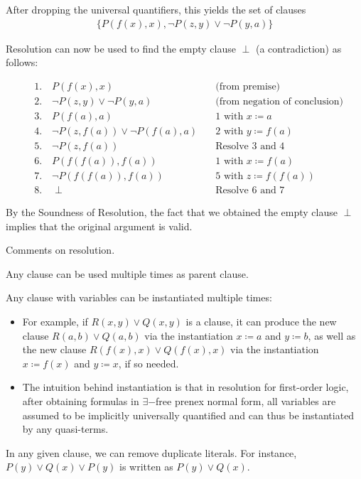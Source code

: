 \documentclass{article}
\begin{document}
After dropping the universal quantifiers, this yields the set of clauses
\begin{align*}
\{P(f(x),x), \neg P(z,y) \vee \neg P(y,a) \}
\end{align*}

Resolution can now be used to find the empty clause $\perp$ (a contradiction) as follows:

\begin{align*}
&1. \quad P(f(x),x) \quad &\text{(from premise)} \\
&2. \quad \neg P(z,y) \vee \neg P(y,a) \quad &\text{(from negation of conclusion)} \\
&3. \quad P(f(a),a) \quad &1 \text{ with } x \coloneqq a \\
&4. \quad \neg P(z,f(a)) \vee \neg P(f(a),a) \quad &2 \text{ with } y \coloneqq f(a) \\
&5. \quad \neg P(z,f(a)) \quad &\text{Resolve 3 and 4} \\
&6. \quad P(f(f(a)),f(a)) \quad &1 \text{ with } x \coloneqq f(a) \\
&7. \quad \neg P(f(f(a)), f(a)) \quad &5 \text{ with } z \coloneqq f(f(a)) \\
&8. \quad \perp \quad &\text{Resolve 6 and 7}
\end{align*}

By the Soundness of Resolution, the fact that we obtained the empty clause $\perp$ implies that the original argument is valid.

Comments on resolution.

Any clause can be used multiple times as parent clause.

Any clause with variables can be instantiated multiple times:
\begin{itemize}
    \item For example, if $R(x,y) \vee Q(x,y)$ is a clause, it can produce the new clause $R(a,b) \vee Q(a,b)$ via the instantiation $x \coloneqq a$ and $y \coloneqq b$, as well as the new clause $R(f(x),x) \vee Q(f(x),x)$ via the instantiation $x \coloneqq f(x)$ and $y \coloneqq x$, if so needed.
    \item The intuition behind instantiation is that in resolution for first-order logic, after obtaining formulas in $\exists-$free prenex normal form, all variables are assumed to be implicitly universally quantified and can thus be instantiated by any quasi-terms. 
\end{itemize}

In any given clause, we can remove duplicate literals. For instance, $P(y) \vee Q(x) \vee P(y)$ is written as $P(y) \vee Q(x)$. 
\end{document}
